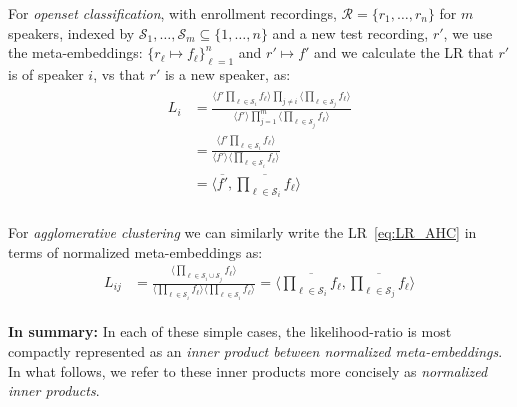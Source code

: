 \documentclass[a4paper,oneside,12pt,english]{report}
\def\expv#1#2{\bigl\langle#1\bigr\rangle_{#2}}
\def\Rset{\mathcal{R}}
\def\Sset{\mathcal{S}}
\def\dot#1#2{\expv{#1,#2}{}}
\def\normal#1{\overline{#1}}
\begin{document}
\noindent For \emph{openset classification}, with enrollment recordings, $\Rset=\{r_1,\ldots,r_n\}$ for $m$ speakers, indexed by $\Sset_1,\ldots,\Sset_m\subseteq\{1,\ldots,n\}$ and a new test recording, $r'$, we use the meta-embeddings: $\{r_\ell\mapsto f_\ell\}_{\ell=1}^n$ and $r'\mapsto f'$ and we calculate the LR that $r'$ is of speaker $i$, vs that $r'$ is a new speaker, as:
\begin{align}
\begin{split}
L_i &= \frac{\expv{f'\prod_{\ell\in\Sset_i} f_\ell}{}\prod_{j\ne i} \expv{\prod_{\ell\in\Sset_j} f_\ell}{}}
{\expv{f'}{}\prod_{j=1}^m \expv{\prod_{\ell\in\Sset_j} f_\ell}{}} \\
&= \frac{\expv{f'\prod_{\ell\in\Sset_i} f_\ell}{}}
{\expv{f'}{}\expv{\prod_{\ell\in\Sset_i} f_\ell}{}} \\
&= \dot{\normal{f'}}{\normal{\prod_{\ell\in\Sset_i} f_\ell}}
\end{split}
\end{align} \\

\noindent For \emph{agglomerative clustering} we can similarly write the LR~\eqref{eq:LR_AHC} in terms of normalized meta-embeddings as:
\begin{align}
L_{ij} &= \frac{\expv{\prod_{\ell\in\Sset_i\cup\Sset_j}f_\ell}{}}{\expv{\prod_{\ell\in\Sset_i}f_\ell}{}\expv{\prod_{\ell\in\Sset_i}f_\ell}{}} = \dot{\normal{\prod_{\ell\in\Sset_i}f_\ell}}{\normal{\prod_{\ell\in\Sset_j}f_\ell}}
\end{align}\\

\noindent \textbf{In summary:} In each of these simple cases, the likelihood-ratio is most compactly represented as an \emph{inner product between normalized meta-embeddings}. In what follows, we refer to these inner products more concisely as \emph{normalized inner products}. %
\end{document}

